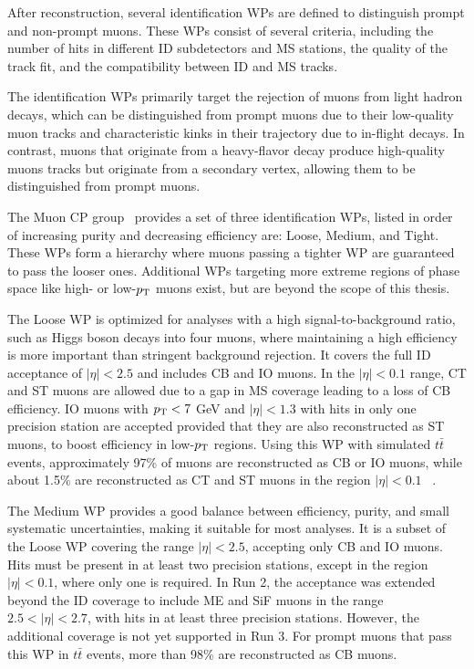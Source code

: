 After reconstruction, several identification WPs are defined to distinguish prompt and non-prompt muons. These WPs consist of several criteria, including the number of hits in different ID subdetectors and MS stations, the quality of the track fit, and the compatibility between ID and MS tracks. 

The identification WPs primarily target the rejection of muons from light hadron decays, which can be distinguished from prompt muons due to their low-quality muon tracks and characteristic kinks in their trajectory due to in-flight decays. In contrast, muons that originate from a heavy-flavor decay produce high-quality muons tracks but originate from a secondary vertex, allowing them to be distinguished from prompt muons.

The Muon CP group~\cite{ATLAS:MCPDocs} provides a set of three identification WPs, listed in order of increasing purity and decreasing efficiency are: Loose, Medium, and Tight. These WPs form a hierarchy where muons passing a tighter WP are guaranteed to pass the looser ones. Additional WPs targeting more extreme regions of phase space like high- or low-$p_{\mathrm{T}}$ muons exist, but are beyond the scope of this thesis. 

The Loose WP is optimized for analyses with a high signal-to-background ratio, such as Higgs boson decays into four muons, where maintaining a high efficiency is more important than stringent background rejection. It covers the full ID acceptance of $|\eta| < 2.5$ and includes CB and IO muons. In the $|\eta| < 0.1$ range, CT and ST muons are allowed due to a gap in MS coverage leading to a loss of CB efficiency. IO muons with $p_{\mathrm{T}} < 7$ GeV and $|\eta| < 1.3$ with hits in only one precision station are accepted provided that they are also reconstructed as ST muons, to boost efficiency in low-$p_{\mathrm{T}}$ regions. Using this WP with simulated $t\bar{t}$ events, approximately 97\% of muons are reconstructed as CB or IO muons, while about 1.5\% are reconstructed as CT and ST muons in the region $|\eta| < 0.1$ ~\cite{ATLAS:2020auj}.

The Medium WP provides a good balance between efficiency, purity, and small systematic uncertainties, making it suitable for most analyses. It is a subset of the Loose WP covering the range $|\eta| < 2.5$, accepting only CB and IO muons. Hits must be present in at least two precision stations, except in the region $|\eta| < 0.1$, where only one is required. In Run 2, the acceptance was extended beyond the ID coverage to include ME and SiF muons in the range $2.5 < |\eta| < 2.7$, with hits in at least three precision stations. However, the additional coverage is not yet supported in Run 3. For prompt muons that pass this WP in $t\bar{t}$ events, more than 98\% are reconstructed as CB muons.

